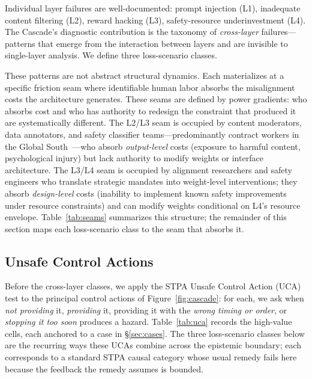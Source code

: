 \documentclass[11pt]{article}
\begin{document}
Individual layer failures are well-documented: prompt injection (L1), inadequate content filtering (L2), reward hacking (L3), safety-resource underinvestment (L4). The Cascade's diagnostic contribution is the taxonomy of \textit{cross-layer} failures---patterns that emerge from the interaction between layers and are invisible to single-layer analysis. We define three loss-scenario classes.

These patterns are not abstract structural dynamics. Each materializes at a specific friction seam where identifiable human labor absorbs the misalignment costs the architecture generates. These seams are defined by power gradients: who absorbs cost and who has authority to redesign the constraint that produced it are systematically different. The L2/L3 seam is occupied by content moderators, data annotators, and safety classifier teams---predominantly contract workers in the Global South~\cite{cnn2024moderators, equidem2025ihrb}---who absorb \textit{output-level} costs (exposure to harmful content, psychological injury) but lack authority to modify weights or interface architecture. The L3/L4 seam is occupied by alignment researchers and safety engineers who translate strategic mandates into weight-level interventions; they absorb \textit{design-level} costs (inability to implement known safety improvements under resource constraints) and can modify weights conditional on L4's resource envelope. Table~\ref{tab:seams} summarizes this structure; the remainder of this section maps each loss-scenario class to the seam that absorbs it.

\subsection{Unsafe Control Actions}\label{sec:uca}

Before the cross-layer classes, we apply the STPA Unsafe Control Action (UCA) test to the principal control actions of Figure~\ref{fig:cascade}: for each, we ask when \emph{not providing} it, \emph{providing} it, providing it with the \emph{wrong timing or order}, or \emph{stopping it too soon} produces a hazard. Table~\ref{tab:uca} records the high-value cells, each anchored to a case in \S\ref{sec:cases}. The three loss-scenario classes below are the recurring ways these UCAs combine across the epistemic boundary; each corresponds to a standard STPA causal category whose usual remedy fails here because the feedback the remedy assumes is bounded.
\end{document}
